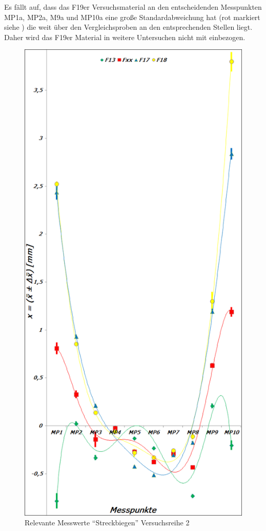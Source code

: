 \documentclass[12pt,a4paper,parskip]{scrartcl}
\begin{document}
Es fällt auf, dass das F19er Versuchsmaterial an den entscheidenden Messpunkten MP1a, MP2a, M9a und MP10a eine große Standardabweichung hat (rot markiert siehe ) die weit über den Vergleichsproben an den entsprechenden Stellen liegt. Daher wird das F19er Material in weitere Untersuchen nicht mit einbezogen.\\
\begin{figure}[hbtp]
\centering
\includegraphics[width=.8\textwidth]{messwerte2}
\caption{Relevante Messwerte "`Streckbiegen"' Versuchsreihe 2}
\label{fig:messw2}
\end{figure}
\end{document}
